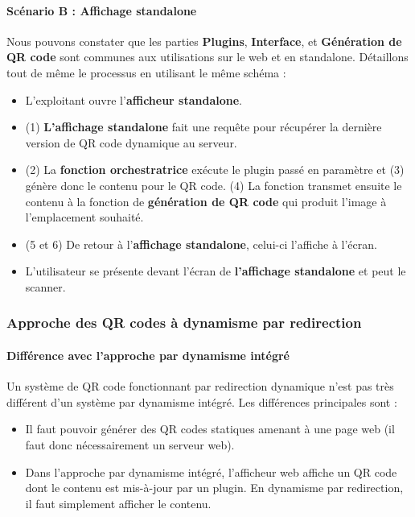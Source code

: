 \documentclass[a4paper,12pt]{article}
\begin{document}
\paragraph{Scénario B : Affichage standalone}
    \label{scen:1B}
\noindent Nous pouvons constater que les parties \textbf{Plugins}, \textbf{Interface}, et \textbf{Génération de QR code} sont communes aux utilisations sur le web et en standalone. Détaillons tout de même le processus en utilisant le même schéma :\\
\begin{itemize}
  \item L'exploitant ouvre l'\textbf{afficheur standalone}.
  \item (1) \textbf{L'affichage standalone} fait une requête pour récupérer la dernière version de QR code dynamique au serveur.
  \item (2) La \textbf{fonction orchestratrice} exécute le plugin passé en paramètre et (3) génère donc le contenu pour le QR code. (4) La fonction transmet ensuite le contenu à la fonction de \textbf{génération de QR code} qui produit l'image à l'emplacement souhaité.
  \item (5 et 6) De retour à l'\textbf{affichage standalone}, celui-ci l'affiche à l'écran.
  \item L'utilisateur se présente devant l'écran de \textbf{l'affichage standalone} et peut le scanner.\\
\end{itemize}


\subsubsection{Approche des QR codes à dynamisme par redirection}


\paragraph{Différence avec l'approche par dynamisme intégré}

\noindent Un système de QR code fonctionnant par redirection dynamique n'est pas très différent d'un système par dynamisme intégré. Les différences principales sont :

\begin{itemize}
  \item Il faut pouvoir générer des QR codes statiques amenant à une page web (il faut donc nécessairement un serveur web).
  \item Dans l'approche par dynamisme intégré, l'afficheur web affiche un QR code dont le contenu est mis-à-jour par un plugin. En dynamisme par redirection, il faut simplement afficher le contenu.
\end{itemize}
\end{document}
